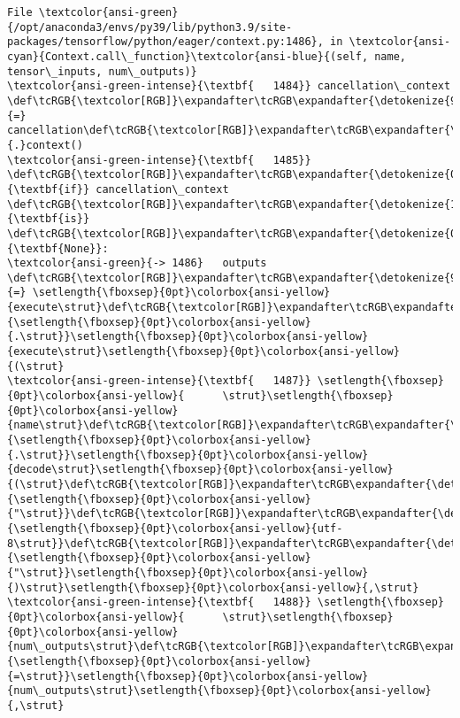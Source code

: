 \documentclass[11pt]{article}
\begin{document}
\begin{Verbatim}[commandchars=\\\{\}, frame=single, framerule=2mm, rulecolor=\color{outerrorbackground}]
File \textcolor{ansi-green}{/opt/anaconda3/envs/py39/lib/python3.9/site-packages/tensorflow/python/eager/context.py:1486}, in \textcolor{ansi-cyan}{Context.call\_function}\textcolor{ansi-blue}{(self, name, tensor\_inputs, num\_outputs)}
\textcolor{ansi-green-intense}{\textbf{   1484}} cancellation\_context \def\tcRGB{\textcolor[RGB]}\expandafter\tcRGB\expandafter{\detokenize{98,98,98}}{=} cancellation\def\tcRGB{\textcolor[RGB]}\expandafter\tcRGB\expandafter{\detokenize{98,98,98}}{.}context()
\textcolor{ansi-green-intense}{\textbf{   1485}} \def\tcRGB{\textcolor[RGB]}\expandafter\tcRGB\expandafter{\detokenize{0,135,0}}{\textbf{if}} cancellation\_context \def\tcRGB{\textcolor[RGB]}\expandafter\tcRGB\expandafter{\detokenize{175,0,255}}{\textbf{is}} \def\tcRGB{\textcolor[RGB]}\expandafter\tcRGB\expandafter{\detokenize{0,135,0}}{\textbf{None}}:
\textcolor{ansi-green}{-> 1486}   outputs \def\tcRGB{\textcolor[RGB]}\expandafter\tcRGB\expandafter{\detokenize{98,98,98}}{=} \setlength{\fboxsep}{0pt}\colorbox{ansi-yellow}{execute\strut}\def\tcRGB{\textcolor[RGB]}\expandafter\tcRGB\expandafter{\detokenize{98,98,98}}{\setlength{\fboxsep}{0pt}\colorbox{ansi-yellow}{.\strut}}\setlength{\fboxsep}{0pt}\colorbox{ansi-yellow}{execute\strut}\setlength{\fboxsep}{0pt}\colorbox{ansi-yellow}{(\strut}
\textcolor{ansi-green-intense}{\textbf{   1487}} \setlength{\fboxsep}{0pt}\colorbox{ansi-yellow}{      \strut}\setlength{\fboxsep}{0pt}\colorbox{ansi-yellow}{name\strut}\def\tcRGB{\textcolor[RGB]}\expandafter\tcRGB\expandafter{\detokenize{98,98,98}}{\setlength{\fboxsep}{0pt}\colorbox{ansi-yellow}{.\strut}}\setlength{\fboxsep}{0pt}\colorbox{ansi-yellow}{decode\strut}\setlength{\fboxsep}{0pt}\colorbox{ansi-yellow}{(\strut}\def\tcRGB{\textcolor[RGB]}\expandafter\tcRGB\expandafter{\detokenize{175,0,0}}{\setlength{\fboxsep}{0pt}\colorbox{ansi-yellow}{"\strut}}\def\tcRGB{\textcolor[RGB]}\expandafter\tcRGB\expandafter{\detokenize{175,0,0}}{\setlength{\fboxsep}{0pt}\colorbox{ansi-yellow}{utf-8\strut}}\def\tcRGB{\textcolor[RGB]}\expandafter\tcRGB\expandafter{\detokenize{175,0,0}}{\setlength{\fboxsep}{0pt}\colorbox{ansi-yellow}{"\strut}}\setlength{\fboxsep}{0pt}\colorbox{ansi-yellow}{)\strut}\setlength{\fboxsep}{0pt}\colorbox{ansi-yellow}{,\strut}
\textcolor{ansi-green-intense}{\textbf{   1488}} \setlength{\fboxsep}{0pt}\colorbox{ansi-yellow}{      \strut}\setlength{\fboxsep}{0pt}\colorbox{ansi-yellow}{num\_outputs\strut}\def\tcRGB{\textcolor[RGB]}\expandafter\tcRGB\expandafter{\detokenize{98,98,98}}{\setlength{\fboxsep}{0pt}\colorbox{ansi-yellow}{=\strut}}\setlength{\fboxsep}{0pt}\colorbox{ansi-yellow}{num\_outputs\strut}\setlength{\fboxsep}{0pt}\colorbox{ansi-yellow}{,\strut}

\end{Verbatim}
\end{document}
